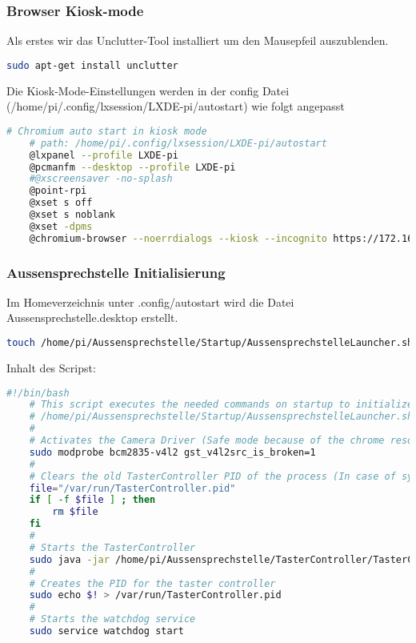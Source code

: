 \subsubsection{Browser Kiosk-mode}
Als erstes wir das Unclutter-Tool installiert um den Mausepfeil auszublenden.
\begin{lstlisting}[backgroundcolor = \color{snippetcolor},
language = bash,
xleftmargin = 1cm,
framexleftmargin = 0.1em,
breaklines=true]
	sudo apt-get install unclutter
\end{lstlisting}
Die Kiosk-Mode-Einstellungen werden in der config Datei  \\ (/home/pi/.config/lxsession/LXDE-pi/autostart) wie folgt angepasst
\begin{lstlisting}[backgroundcolor = \color{snippetcolor},
language = bash,
xleftmargin = 1cm,
framexleftmargin = 0.1em,
breaklines=true]
	# Chromium auto start in kiosk mode
	# path: /home/pi/.config/lxsession/LXDE-pi/autostart
	@lxpanel --profile LXDE-pi
	@pcmanfm --desktop --profile LXDE-pi
	#@xscreensaver -no-splash
	@point-rpi
	@xset s off
	@xset s noblank
	@xset -dpms
	@chromium-browser --noerrdialogs --kiosk --incognito https://172.16.111.99/server
\end{lstlisting}

\subsubsection{Aussensprechstelle Initialisierung}
Im Homeverzeichnis unter .config/autostart wird die Datei Aussensprechstelle.desktop erstellt.
\begin{lstlisting}[backgroundcolor = \color{snippetcolor},
language = bash,
xleftmargin = 1cm,
framexleftmargin = 0.1em,
breaklines=true]
	touch /home/pi/Aussensprechstelle/Startup/AussensprechstelleLauncher.sh
\end{lstlisting}
Inhalt des Scripst:
\begin{lstlisting}[backgroundcolor = \color{snippetcolor},
language = bash,
xleftmargin = 1cm,
framexleftmargin = 0.1em,
breaklines=true]
	#!/bin/bash
	# This script executes the needed commands on startup to initialize the Aussensprechstelle
	# /home/pi/Aussensprechstelle/Startup/AussensprechstelleLauncher.sh
	#
	# Activates the Camera Driver (Safe mode because of the chrome resolution bug)
	sudo modprobe bcm2835-v4l2 gst_v4l2src_is_broken=1
	#
	# Clears the old TasterController PID of the process (In case of system shutdown)
	file="/var/run/TasterController.pid"
	if [ -f $file ] ; then
		rm $file
	fi
	#
	# Starts the TasterController
	sudo java -jar /home/pi/Aussensprechstelle/TasterController/TasterController.jar &
	#
	# Creates the PID for the taster controller
	sudo echo $! > /var/run/TasterController.pid
	#
	# Starts the watchdog service
	sudo service watchdog start	
\end{lstlisting}

